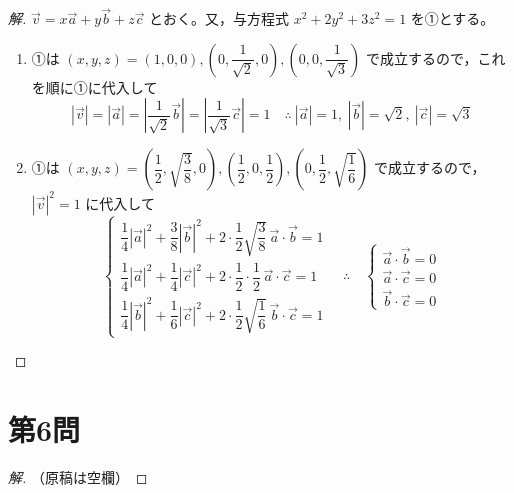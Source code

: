 \documentclass[../main.tex]{subfiles}
\begin{document}
\begin{proof}[解]
  $\vec{v}=x\vec{a}+y\vec{b}+z\vec{c}$ とおく。又，与方程式 $x^2+2y^2+3z^2=1$ を①とする。

  \begin{enumerate}
    \item[(1)] ①は $(x,y,z)=(1,0,0),\left(0,\dfrac{1}{\sqrt2},0\right),\left(0,0,\dfrac{1}{\sqrt3}\right)$ で成立するので，これを順に①に代入して
      \[
        |\vec{v}|=|\vec{a}|=\left|\frac{1}{\sqrt2}\vec{b}\right|=\left|\frac{1}{\sqrt3}\vec{c}\right|=1 \quad\therefore\ |\vec{a}|=1,\ |\vec{b}|=\sqrt2,\ |\vec{c}|=\sqrt3
      \]

    \item[(2)] ①は $(x,y,z)=\left(\dfrac{1}{2},\sqrt{\dfrac38},0\right),\left(\dfrac12,0,\dfrac12\right),\left(0,\dfrac12,\sqrt{\dfrac16}\right)$ で成立するので，$|\vec v|^2=1$ に代入して
      \[
        \begin{cases}
          \dfrac14|\vec a|^2+\dfrac38|\vec b|^2+2\cdot\dfrac12\sqrt{\dfrac38}\,\vec a\cdot\vec b=1 \\
          \dfrac14|\vec a|^2+\dfrac14|\vec c|^2+2\cdot\dfrac12\cdot\dfrac12\,\vec a\cdot\vec c=1 \\
          \dfrac14|\vec b|^2+\dfrac16|\vec c|^2+2\cdot\dfrac12\sqrt{\dfrac16}\,\vec b\cdot\vec c=1
        \end{cases}
        \quad\therefore\quad
        \begin{cases}
          \vec a\cdot\vec b=0 \\
          \vec a\cdot\vec c=0 \\
          \vec b\cdot\vec c=0
        \end{cases}
      \]
  \end{enumerate}
\end{proof}

\newpage

\section*{第6問}

\begin{proof}[解]
  （原稿は空欄）
\end{proof}
\end{document}
